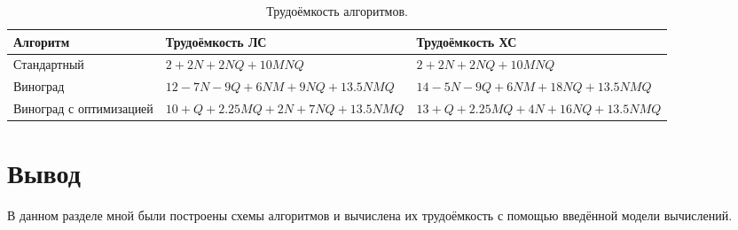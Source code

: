 \begin{table}[!htbp]
	\centering
	\caption{Трудоёмкость алгоритмов.}
	\small
	\begin{tabularx}{\textwidth}{|*{3}{X|}}
		\hline
		\textbf{Алгоритм} & \textbf{Трудоёмкость ЛС} & \textbf{Трудоёмкость ХС} \\\hline
		Стандартный & $2 + 2N + 2NQ + 10MNQ$ & $2 + 2N + 2NQ + 10MNQ$ \\\hline
		Виноград & $12 - 7N - 9Q + 6NM + 9NQ + 13.5NMQ$ & $14 - 5N - 9Q + 6NM + 18NQ + 13.5NMQ$ \\\hline
		Виноград с оптимизацией & $10 + Q + 2.25MQ + 2N + 7NQ + 13.5NMQ$ & $13 + Q + 2.25MQ + 4N + 16NQ + 13.5NMQ$ \\\hline
	\end{tabularx}
\end{table}
\FloatBarrier

\section*{Вывод}

В данном разделе мной были построены схемы алгоритмов и вычислена их трудоёмкость с помощью введённой модели вычислений.

\clearpage
